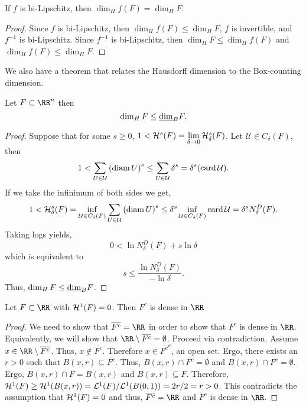 \begin{corollary}
	If $f$ is bi-Lipschitz, then $\dim_H f(F)=\dim_H F$.
\end{corollary}

\begin{proof}
	Since $f$ is bi-Lipschitz, then $\dim_H f(F)\leq \dim_H F$, $f$ is invertible, and $f^{-1}$ is bi-Lipschitz.
	Since $f^{-1}$ is bi-Lipschitz, then $\dim_H F \leq \dim_H f(F)$ and $\dim_H f(F)\leq \dim_H F$.
\end{proof}

We also have a theorem that relates the Hausdorff dimension to the Box-counting dimension.

\begin{thm}
	Let $F\subset\RR^n$ then
	\[
		\operatorname{dim}_H F \leq \underline{\operatorname{dim}}_B F.
	\]
\end{thm}
\begin{proof}
	Suppose that for some $s\geq 0$, $1<\mathcal{H}^s(F)=\lim\limits_{\delta\rightarrow 0}\mathcal{H}^s_\delta(F)$.
	Let $\mathcal{U}\in C_\delta(F)$, then
	\[
		1 < \sum_{U\in\mathcal{U}}{(\operatorname{diam} U)}^s
		\leq\sum_{U\in\mathcal{U}}\delta^s
		=\delta^s (\operatorname{card} \mathcal{U}).
	\]
	If we take the infinimum of both sides we get,
	\[
		1 < \mathcal{H}^s_\delta(F)
		=\inf_{\mathcal{U}\in C_\delta(F)}\sum_{U\in\mathcal{U}} {(\operatorname{diam}{U})}^s
		\leq \delta^s\inf_{\mathcal{U}\in C_\delta(F)}\operatorname{card}{\mathcal{U}}
		=\delta^s N_\delta^D(F).
	\]
	Taking logs yields,
	\[
		0 < \ln N_\delta^D(F)+s\ln \delta
	\]
	which is equivalent to
	\[
		s\leq \frac{\ln N^D_\delta(F)}{-\ln\delta}.
	\]
	Thus, $\operatorname{dim}_H F\leq \underline{\operatorname{dim}}_B F$.
\end{proof}

\begin{lemma}\label{hd-lem3}
	Let $F\subset\RR$ with $\mathcal{H}^1(F) = 0$.
	Then $F^c$ is dense in $\RR$
\end{lemma}

\begin{proof}
	We need to show that $\overline{F^c}=\RR$ in order to show that $F^c$ is dense in $\RR$.
	Equivalently, we will show that $\RR\setminus\overline{F^c}=\emptyset$.
	Proceed via contradiction.
	Assume $x\in\RR\setminus\overline{F^c}$.
	Thus, $x\notin\overline{F^c}$.
	Therefore $x\in{\overline{F^c}}^c$, an open set.
	Ergo, there exists an $r>0$ such that $B(x,r)\subseteq\overline{F^c}$.
	Thus, $B(x,r)\cap\overline{F^c}=\emptyset$ and $B(x,r)\cap F^c=\emptyset$.
	Ergo, $B(x,r)\cap F = B(x,r)$ and $B(x,r)\subseteq F$.
	Therefore, $\mathcal{H}^1(F)\geq\mathcal{H}^1(B(x,r))=\mathcal{L}^1(F)/\mathcal{L}^1(B(0,1))=2r/2=r>0$.
	This contradicts the assumption that $\mathcal{H}^1(F)=0$ and thus, $\overline{F^c}=\RR$ and $F^c$ is dense in $\RR$.
\end{proof}

